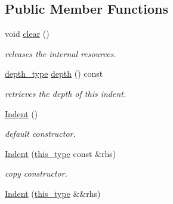 \subsection*{Public Member Functions}
\begin{DoxyCompactItemize}
\item 
\hypertarget{classhryky_1_1_indent_a855f7e2351660ee3d018187000292b01}{void \hyperlink{classhryky_1_1_indent_a855f7e2351660ee3d018187000292b01}{clear} ()}\label{classhryky_1_1_indent_a855f7e2351660ee3d018187000292b01}

\begin{DoxyCompactList}\small\item\em releases the internal resources. \end{DoxyCompactList}\item 
\hypertarget{classhryky_1_1_indent_a2bbdf69a07840bff3cc52397d67ea29d}{\hyperlink{classhryky_1_1_indent_a38d8402509b64e77009a1a86b6be4939}{depth\-\_\-type} \hyperlink{classhryky_1_1_indent_a2bbdf69a07840bff3cc52397d67ea29d}{depth} () const }\label{classhryky_1_1_indent_a2bbdf69a07840bff3cc52397d67ea29d}

\begin{DoxyCompactList}\small\item\em retrieves the depth of this indent. \end{DoxyCompactList}\item 
\hyperlink{classhryky_1_1_indent_abb56d4eec722043101f2836619b7f4e1}{Indent} ()
\begin{DoxyCompactList}\small\item\em default constructor. \end{DoxyCompactList}\item 
\hypertarget{classhryky_1_1_indent_a8d657ef48f6e33fd7e649eaccb62cee9}{\hyperlink{classhryky_1_1_indent_a8d657ef48f6e33fd7e649eaccb62cee9}{Indent} (\hyperlink{classhryky_1_1_indent_acbe5e44b7c58ede382914e8a3f7d2987}{this\-\_\-type} const \&rhs)}\label{classhryky_1_1_indent_a8d657ef48f6e33fd7e649eaccb62cee9}

\begin{DoxyCompactList}\small\item\em copy constructor. \end{DoxyCompactList}\item 
\hypertarget{classhryky_1_1_indent_aa61919aa826b7042266bb5fce42df7e1}{\hyperlink{classhryky_1_1_indent_aa61919aa826b7042266bb5fce42df7e1}{Indent} (\hyperlink{classhryky_1_1_indent_acbe5e44b7c58ede382914e8a3f7d2987}{this\-\_\-type} \&\&rhs)}\label{classhryky_1_1_indent_aa61919aa826b7042266bb5fce42df7e1}


\end{DoxyCompactItemize}
